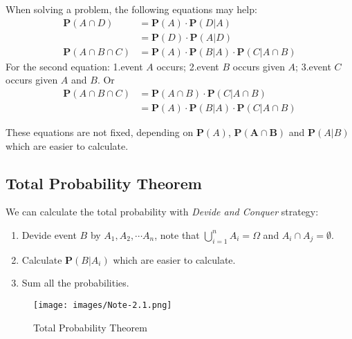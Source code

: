 When solving a problem, the following equations may help:
\begin{align}
    \mathbf{P}(A \cap D) &= \mathbf{P}(A) \cdot \mathbf{P}(D|A) \\
    &= \mathbf{P}(D) \cdot \mathbf{P}(A|D) \\
    \mathbf{P}(A \cap B \cap C) &= \mathbf{P}(A) \cdot \mathbf{P}(B|A) \cdot \mathbf{P}(C|A \cap B)
\end{align}
For the second equation: 1.event $A$ occurs; 2.event $B$ occurs given $A$; 3.event $C$ occurs given $A$ and $B$. Or
\begin{align*}
    \mathbf{P}(A \cap B \cap C) &= \mathbf{P}(A \cap B) \cdot \mathbf{P}(C | A \cap B) \\ 
    &= \mathbf{P}(A) \cdot \mathbf{P}(B | A) \cdot \mathbf{P}(C | A \cap B)
\end{align*}
\begin{remark}
    These equations are not fixed, depending on $\mathbf{P}(A)$, $\mathbf{P(A \cap B)}$ and $\mathbf{P}(A | B)$ which are easier to calculate.
\end{remark}

\subsection{Total Probability Theorem}
We can calculate the total probability with \textit{Devide and Conquer} strategy:
\begin{enumerate}
    \item Devide event $B$ by $A_1, A_2, \cdots A_n$, note that $\bigcup_{i=1}^n A_i = \varOmega$ and $A_i \cap A_j = \emptyset$.
    \item Calculate $\mathbf{P}(B | A_i)$ which are easier to calculate.
    \item Sum all the probabilities.
\end{enumerate}
\begin{figure}[H]
    \centering
    \texttt{[image: images/Note-2.1.png]}
    \caption{Total Probability Theorem}
    \label{fig:total-probability}
\end{figure}

